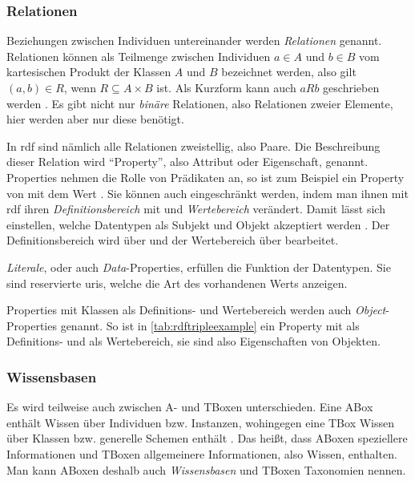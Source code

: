 \subsubsection{Relationen}
Beziehungen zwischen Individuen untereinander werden \emph{Relationen} genannt.
Relationen können als Teilmenge zwischen Individuen $a \in A$ und $b \in B$ vom kartesischen Produkt der Klassen $A$ und $B$ bezeichnet werden,
also gilt $(a,b) \in R$, wenn $R \subseteq A \times B$ ist.
Als Kurzform kann auch $aRb$ geschrieben werden \citep[S.~263]{semanticwebgrundlagen}.
Es gibt nicht nur \emph{binäre} Relationen, also Relationen zweier Elemente, hier werden aber nur diese benötigt.

In \ac{rdf} sind nämlich alle Relationen zweistellig, also Paare.
Die Beschreibung dieser Relation wird \enquote{Property}, also Attribut oder Eigenschaft, genannt.
Properties nehmen die Rolle von Prädikaten an, so ist zum Beispiel  ein Property von  mit dem Wert .
Sie können auch eingeschränkt werden, indem man ihnen mit \ac{rdf} ihren \emph{Definitionsbereich} mit und \emph{Wertebereich} verändert.
Damit lässt sich einstellen, welche Datentypen als Subjekt und Objekt akzeptiert werden \citep[S.~76]{semanticwebgrundlagen}.
Der Definitionsbereich wird über  und der Wertebereich über  bearbeitet.

\emph{Literale}, oder auch \emph{Data}-Properties, erfüllen die Funktion der Datentypen.
Sie sind reservierte \acp{uri}, welche die Art des vorhandenen Werts anzeigen.

Properties mit Klassen als Definitions- und Wertebereich werden auch \emph{Object}-Properties genannt.
So ist in \cref{tab:rdftripleexample}  ein Property mit  als Definitions- und  als Wertebereich,
sie sind also Eigenschaften von Objekten.

\subsubsection{Wissensbasen}
Es wird teilweise auch zwischen A- und TBoxen unterschieden.
Eine ABox enthält Wissen über Individuen bzw. Instanzen, wohingegen eine TBox Wissen über Klassen bzw. generelle Schemen enthält \citep[S.~167]{semanticwebgrundlagen}.
Das heißt, dass ABoxen speziellere Informationen und TBoxen allgemeinere Informationen, also Wissen, enthalten.
Man kann ABoxen deshalb auch \emph{Wissensbasen} und TBoxen Taxonomien nennen.

